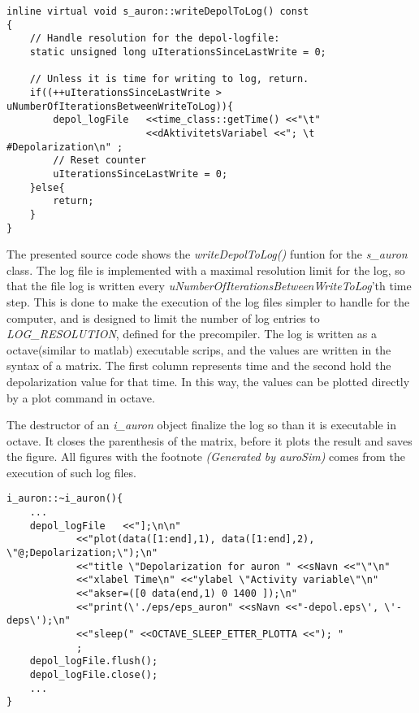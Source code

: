 \begin{lstlisting}
inline virtual void s_auron::writeDepolToLog() const 
{
	// Handle resolution for the depol-logfile:
	static unsigned long uIterationsSinceLastWrite = 0;

	// Unless it is time for writing to log, return.
	if((++uIterationsSinceLastWrite > uNumberOfIterationsBetweenWriteToLog)){
		depol_logFile 	<<time_class::getTime() <<"\t" 
						<<dAktivitetsVariabel <<"; \t #Depolarization\n" ;
		// Reset counter
		uIterationsSinceLastWrite = 0;
	}else{
		return;
	}
}
\end{lstlisting}
			
			The presented source code shows the \emph{writeDepolToLog()} funtion for the \emph{s\_auron} class.
			The log file is implemented with a maximal resolution limit for the log, so that the file log is written every \emph{uNumberOfIterationsBetweenWriteToLog}'th time step.
			This is done to make the execution of the log files simpler to handle for the computer, and is designed to limit the number of log entries to \emph{LOG\_RESOLUTION}, defined for the precompiler.
			The log is written as a octave(similar to matlab) executable scrips, and the values are written in the syntax of a matrix.
			The first column represents time and the second hold the depolarization value for that time. 
			In this way, the values can be plotted directly by a plot command in octave.

			The destructor of an \emph{i\_auron} object finalize the log so than it is executable in octave.
			It closes the parenthesis of the matrix, before it plots the result and saves the figure.
			All figures with the footnote \emph{(Generated by \emph{auroSim})} comes from the execution of such log files.
\begin{lstlisting}
i_auron::~i_auron(){
	...
	depol_logFile 	<<"];\n\n"
			<<"plot(data([1:end],1), data([1:end],2), \"@;Depolarization;\");\n"
			<<"title \"Depolarization for auron " <<sNavn <<"\"\n"
			<<"xlabel Time\n" <<"ylabel \"Activity variable\"\n"
			<<"akser=([0 data(end,1) 0 1400 ]);\n"
			<<"print(\'./eps/eps_auron" <<sNavn <<"-depol.eps\', \'-deps\');\n"
			<<"sleep(" <<OCTAVE_SLEEP_ETTER_PLOTTA <<"); "
			;
	depol_logFile.flush();
	depol_logFile.close();
	...
}
\end{lstlisting}
			
